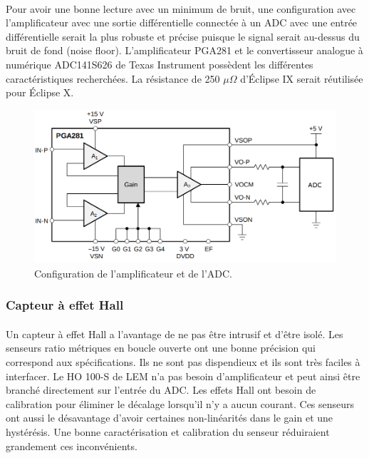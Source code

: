 	\paragraph*{}
	Pour avoir une bonne lecture avec un minimum de bruit, une configuration avec l'amplificateur avec une sortie différentielle connectée à un ADC avec une entrée différentielle serait la plus robuste et précise puisque le signal serait au-dessus du bruit de fond (noise floor). L'amplificateur PGA281 et le convertisseur analogue à numérique ADC141S626 de Texas Instrument possèdent les différentes caractéristiques recherchées. La résistance de 250 $\mu \Omega$ d'Éclipse IX serait réutilisée pour Éclipse X.

	\begin{figure}[H]
		\centering
		\includegraphics[scale = 0.4]{Images/current_sense_shunt.png}
		\caption{Configuration de l'amplificateur et de l'ADC.}
		\label{fig:current_sense_shunt}
	\end{figure}

	\subsubsection*{Capteur à effet Hall}
	\paragraph*{}
	Un capteur à effet Hall a l'avantage de ne pas être intrusif et d'être isolé. Les senseurs ratio métriques en boucle ouverte ont une bonne précision qui correspond aux spécifications. Ils ne sont pas dispendieux et ils sont très faciles à interfacer. Le HO 100-S de LEM n'a pas besoin d'amplificateur et peut ainsi être branché directement sur l'entrée du ADC. Les effets Hall ont besoin de calibration pour éliminer le décalage lorsqu'il n'y a aucun courant. Ces senseurs ont aussi le désavantage d'avoir certaines non-linéarités dans le gain et une hystérésis. Une bonne caractérisation et calibration du senseur réduiraient grandement ces inconvénients.

